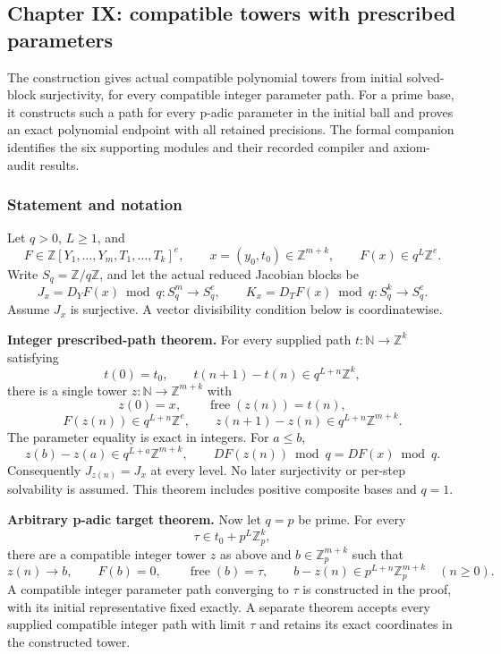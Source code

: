 \hypertarget{cont9:paper-ix-compatible-towers-with-prescribed-parameters}{%
\subsection{Chapter IX: compatible towers with prescribed
parameters}\label{cont9:paper-ix-compatible-towers-with-prescribed-parameters}}

The construction gives actual compatible polynomial towers from initial
solved-block surjectivity, for every compatible integer parameter path.
For a prime base, it constructs such a path for every p-adic parameter
in the initial ball and proves an exact polynomial endpoint with all
retained precisions. The formal companion identifies the six supporting modules and their
recorded compiler and axiom-audit results.

\hypertarget{cont9:statement-and-notation}{%
\subsubsection{Statement and notation}\label{cont9:statement-and-notation}}

Let \(q>0\), \(L\ge1\), and \[
F\in\mathbb Z[Y_1,\ldots,Y_m,T_1,\ldots,T_k]^e,
\qquad x=(y_0,t_0)\in\mathbb Z^{m+k},
\qquad F(x)\in q^L\mathbb Z^e.
\] Write \(S_q=\mathbb Z/q\mathbb Z\), and let the actual reduced
Jacobian blocks be \[
J_x=D_YF(x)\bmod q:S_q^m\longrightarrow S_q^e,
\qquad K_x=D_TF(x)\bmod q:S_q^k\longrightarrow S_q^e.
\] Assume \(J_x\) is surjective. A vector divisibility condition below
is coordinatewise.

\textbf{Integer prescribed-path theorem.} For every supplied path
\(t:\mathbb N\to\mathbb Z^k\) satisfying \[
t(0)=t_0,\qquad t(n+1)-t(n)\in q^{L+n}\mathbb Z^k,
\] there is a single tower \(z:\mathbb N\to\mathbb Z^{m+k}\) with \[
z(0)=x,\qquad \operatorname{free}(z(n))=t(n),
\] \[
F(z(n))\in q^{L+n}\mathbb Z^e,\qquad
z(n+1)-z(n)\in q^{L+n}\mathbb Z^{m+k}.
\] The parameter equality is exact in integers. For \(a\le b\), \[
z(b)-z(a)\in q^{L+a}\mathbb Z^{m+k},\qquad
DF(z(n))\bmod q=DF(x)\bmod q.
\] Consequently \(J_{z(n)}=J_x\) at every level. No later surjectivity
or per-step solvability is assumed. This theorem includes positive
composite bases and \(q=1\).

\textbf{Arbitrary p-adic target theorem.} Now let \(q=p\) be prime. For
every \[
\tau\in t_0+p^L\mathbb Z_p^k,
\] there are a compatible integer tower \(z\) as above and
\(b\in\mathbb Z_p^{m+k}\) such that \[
z(n)\longrightarrow b,\qquad F(b)=0,\qquad
\operatorname{free}(b)=\tau,
\qquad b-z(n)\in p^{L+n}\mathbb Z_p^{m+k}\quad(n\ge0).
\] A compatible integer parameter path converging to \(\tau\) is
constructed in the proof, with its initial representative fixed exactly.
A separate theorem accepts every supplied compatible integer path with
limit \(\tau\) and retains its exact coordinates in the constructed
tower.

